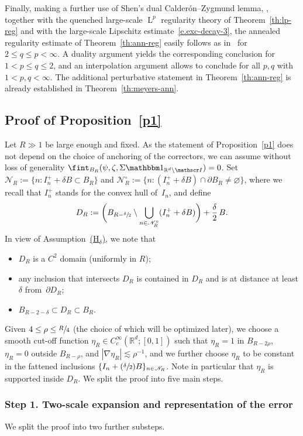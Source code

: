 \documentclass[JEP,XML,SOM,Unicode,published]{cedram}
\let\mathcal\mathscr
\newcommand{\Hd}{\hyperref[Hd]{\textup{(H$_\delta$)}}\xspace}
\newcommand{\Psfrac}[2]{(\sfrac{#1}{#2})}
\let\mathds\mathbbm
\theoremstyle{plain}
\theoremstyle{definition}
\newcommand{\R}{\mathbb R}
\newcommand{\Ic}{\mathcal I}
\newcommand{\Nc}{\mathcal N}
\newcommand{\Ld}{\operatorname{L}}
\newcommand{\step}[1]{\subsubsection*{Step #1}}
\begin{document}
Finally, making a further use of Shen's dual Calderón--Zygmund lemma, \cf \cite[Th.\,3.2 or~3.4]{Shen-07}, together with the quenched large-scale $\Ld^p$ regularity theory of Theorem~\ref{th:lp-reg} and with the large-scale Lipschitz estimate~\eqref{e.exc-decay-3}, the annealed regularity estimate of Theorem~\ref{th:ann-reg} easily follows as in~\cite{DO1} for $2\le q\le p<\infty$.
A duality argument yields the corresponding conclusion for $1<p\le q\le2$, and an interpolation argument allows to conclude for all $p,q$ with $1<p,q<\infty$. The additional perturbative statement in Theorem~\ref{th:ann-reg} is already established in Theorem~\ref{th:meyers-ann}.

\subsection{Proof of Proposition~\ref{p1}}\label{sec:pr-p1}
Let $R\gg1$ be large enough and fixed. As the statement of Proposition~\ref{p1} does not depend on the choice of anchoring of the correctors, we can assume without loss of generality $\fint_{B_R} (\psi,\zeta,\Sigma\mathds1_{\R^d\setminus\Ic})=0$.
Set $\Nc_R:=\{n:I_n^++\delta B\subset B_{R}\}$ and $\Nc_R^\circ:=\{n:(I_n^++\delta B)\cap \partial B_{R}\ne\varnothing\}$, where we recall that $I_n^+$ stands for the convex hull of~$I_n$, and define
\[D_R:=\bigg(B_{R-\sfrac\delta2}\setminus\bigcup_{n\in\Nc_R^\circ}(I_n^++\delta B)\bigg)+\frac\delta2\,B.\]
In view of Assumption~\Hd, we note that
\begin{itemize}
\item $D_R$ is a $C^2$ domain (uniformly in $R$);
\item any inclusion that intersects $D_R$ is contained in $D_R$ and is at distance at least $\delta$ from~$\partial D_R$;
\item $B_{R-2-\delta}\subset D_R\subset B_R$.
\end{itemize}
Given $4\le\rho\le\sfrac R4$ (the choice of which will be optimized later), we choose a smooth cut-off function $\eta_R\in C^\infty_c(\R^d;[0,1])$ such that $\eta_R=1$ in $B_{R-2\rho}$, $\eta_R=0$ outside $B_{R-\rho}$, and $|\nabla\eta_R|\lesssim\rho^{-1}$, and we further choose $\eta_R$ to be constant in the fattened inclusions $\{I_n+\Psfrac\delta2 B\}_{n\in\Nc_R}$.
Note in particular that $\eta_R$ is supported inside $D_R$.
We split the proof into five main steps.

\step{1. Two-scale expansion and representation of the error}
We split the proof into two further substeps.
\end{document}
